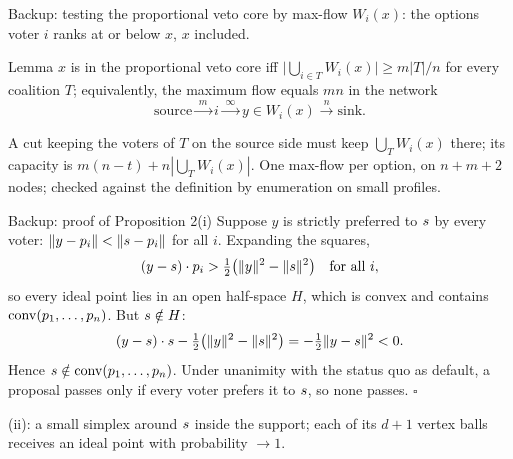 \documentclass[10pt,aspectratio=169]{beamer}
\begin{document}
\begin{frame}{Backup: testing the proportional veto core by max-flow}
  $W_i(x)$: the options voter $i$ ranks at or below $x$, $x$ included.
  \begin{block}{Lemma}
    $x$ is in the proportional veto core iff $\bigl|\bigcup_{i \in T} W_i(x)\bigr| \ge m|T|/n$ for every
    coalition $T$; equivalently, the maximum flow equals $mn$ in the network
    \[
      \text{source} \xrightarrow{\;m\;} i \xrightarrow{\;\infty\;} y \in W_i(x) \xrightarrow{\;n\;}
      \text{sink}.
    \]
  \end{block}
  A cut keeping the voters of $T$ on the source side must keep $\bigcup_T W_i(x)$ there; its capacity is
  $m(n-t) + n|\bigcup_T W_i(x)|$. One max-flow per option, on $n + m + 2$ nodes; checked against the
  definition by enumeration on small profiles. 
\end{frame}

\begin{frame}{Backup: proof of Proposition 2(i)}
  Suppose $y$ is strictly preferred to $s$ by every voter: $\|y - p_i\| < \|s - p_i\|$ for all $i$.
  Expanding the squares,
  \[
    (y - s) \cdot p_i > \tfrac12\bigl(\|y\|^2 - \|s\|^2\bigr) \quad \text{for all } i,
  \]
  so every ideal point lies in an open half-space $H$, which is convex and contains
  $\operatorname{conv}(p_1, \dots, p_n)$. But $s \notin H$:
  \[
    (y - s) \cdot s - \tfrac12\bigl(\|y\|^2 - \|s\|^2\bigr) = -\tfrac12\|y - s\|^2 < 0.
  \]
  Hence $s \notin \operatorname{conv}(p_1, \dots, p_n)$. Under unanimity with the status quo as default, a proposal
  passes only if every voter prefers it to $s$, so none passes. \hfill$\square$
  \medskip

  (ii): a small simplex around $s$ inside the support; each of its $d+1$ vertex balls receives an ideal
  point with probability $\to 1$.
\end{frame}
\end{document}
